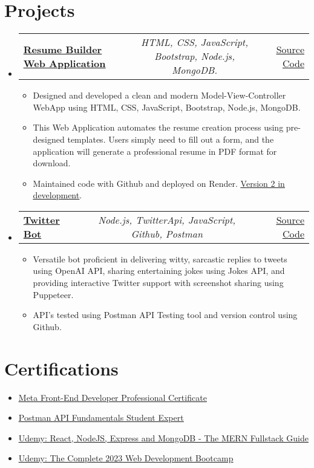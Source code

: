 \documentclass[a4paper,11pt]{article}
\makeatletter
\newcommand{\resumeItem}[1]{
  \item\small{#1}
}
\newcommand{\resumeItemListStart}{\begin{itemize}[rightmargin=0.11in]}
\newcommand{\resumeItemListEnd}{\end{itemize}}
\newcommand{\resumeTrioHeading}[3]{
  \item\small{
    \begin{tabular*}{0.96\textwidth}[t]{
      l@{\extracolsep{\fill}}c@{\extracolsep{\fill}}r
    }
      \textbf{#1} & \textit{#2} & #3
    \end{tabular*}
  }
}
\newcommand{\resumeHeadingListStart}{
  \begin{itemize}[leftmargin=0.15in, label={}]
}
\newcommand{\resumeHeadingListEnd}{\end{itemize}}
\makeatother
\begin{document}
\section{Projects}
  \resumeHeadingListStart{}
    \resumeTrioHeading{\href{https://my-college-project-site.onrender.com/}{\uline{Resume Builder Web Application}}}{HTML, CSS, JavaScript, Bootstrap, Node.js, MongoDB.}{\href{https://github.com/jpatidar9826/Cproject2}{\uline{Source Code}}}
      \resumeItemListStart{}
        \resumeItem{Designed and developed a clean and modern Model-View-Controller WebApp using HTML, CSS, JavaScript, Bootstrap, Node.js, MongoDB.}
        \resumeItem{This Web Application automates the resume creation process using pre-designed templates. Users simply need to ﬁll out a form, and the application will generate a professional resume in PDF format for download.}
        \resumeItem{Maintained code with Github and deployed on Render. {\href{https://raysume-react-app.onrender.com/}{\uline{Version 2 in development}}}.}
      \resumeItemListEnd{}

      \resumeTrioHeading{\uline{Twitter Bot}}{Node.js, TwitterApi, JavaScript, Github, Postman}{\href{https://github.com/jpatidar9826/twibot}{\uline{Source Code}}}
      \resumeItemListStart{}
        \resumeItem{Versatile bot proficient in delivering witty, sarcastic replies to tweets using OpenAI API, sharing entertaining jokes using Jokes API, and providing interactive Twitter support with screenshot sharing using Puppeteer.}
        \resumeItem{API's tested using Postman API Testing tool and version control using Github.}
      \resumeItemListEnd{}
  \resumeHeadingListEnd{}



\section{Certifications}
  \resumeItemListStart{}
    \resumeItem{\href{https://coursera.org/share/d90c9bb5e5f2df54df0adcca08c48bf7}{\uline{Meta Front-End Developer Professional Certificate}}}
    \resumeItem{\href{https://api.badgr.io/public/assertions/0X9F6PZITLiIjadC-0Fb0g}{\uline{Postman API Fundamentals Student Expert}}}
    \resumeItem{\href{https://www.udemy.com/certificate/UC-8329afaa-c3e3-490f-a541-1e7da1237daf/}{\uline{Udemy: React, NodeJS, Express and MongoDB - The MERN Fullstack Guide}}}
    \resumeItem{\href{https://www.udemy.com/certificate/UC-d9b53b4a-f54c-476b-800c-593d1212be9f/}{\uline{Udemy:
The Complete 2023 Web Development Bootcamp}}}
  \resumeItemListEnd{}
\end{document}
